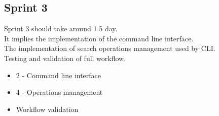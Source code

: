 \subsection{Sprint 3}
Sprint 3 should take around 1.5 day.\\
It implies the implementation of the command line interface.\\
The implementation of search operations management used by CLI.\\
Testing and validation of full workflow.
    \begin{itemize}
        \item 2 - Command line interface
        \item 4 - Operations management
        \item Workflow validation
    \end{itemize}
